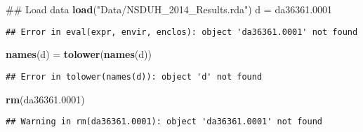 \documentclass[]{article}
\newenvironment{Shaded}{\begin{snugshade}}{\end{snugshade}}
\newcommand{\KeywordTok}[1]{\textcolor[rgb]{0.13,0.29,0.53}{\textbf{#1}}}
\newcommand{\DecValTok}[1]{\textcolor[rgb]{0.00,0.00,0.81}{#1}}
\newcommand{\StringTok}[1]{\textcolor[rgb]{0.31,0.60,0.02}{#1}}
\newcommand{\NormalTok}[1]{#1}
\begin{document}
\begin{Shaded}
\begin{Highlighting}[]
\NormalTok{## Load data}
\KeywordTok{load}\NormalTok{(}\StringTok{"Data/NSDUH_2014_Results.rda"}\NormalTok{)}
\NormalTok{d =}\StringTok{ }\NormalTok{da36361.}\DecValTok{0001}
\end{Highlighting}
\end{Shaded}

\begin{verbatim}
## Error in eval(expr, envir, enclos): object 'da36361.0001' not found
\end{verbatim}

\begin{Shaded}
\begin{Highlighting}[]
\KeywordTok{names}\NormalTok{(d) =}\StringTok{ }\KeywordTok{tolower}\NormalTok{(}\KeywordTok{names}\NormalTok{(d))}
\end{Highlighting}
\end{Shaded}

\begin{verbatim}
## Error in tolower(names(d)): object 'd' not found
\end{verbatim}

\begin{Shaded}
\begin{Highlighting}[]
\KeywordTok{rm}\NormalTok{(da36361.}\DecValTok{0001}\NormalTok{)}
\end{Highlighting}
\end{Shaded}

\begin{verbatim}
## Warning in rm(da36361.0001): object 'da36361.0001' not found
\end{verbatim}
\end{document}
